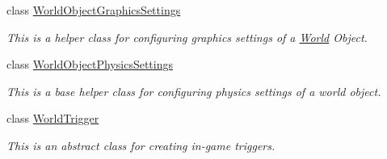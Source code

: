 \begin{DoxyCompactItemize}
class \hyperlink{classMezzanine_1_1WorldObjectGraphicsSettings}{WorldObjectGraphicsSettings}
\begin{DoxyCompactList}\small\item\em This is a helper class for configuring graphics settings of a \hyperlink{classMezzanine_1_1World}{World} Object. \item\end{DoxyCompactList}\item 
class \hyperlink{classMezzanine_1_1WorldObjectPhysicsSettings}{WorldObjectPhysicsSettings}
\begin{DoxyCompactList}\small\item\em This is a base helper class for configuring physics settings of a world object. \item\end{DoxyCompactList}\item 
class \hyperlink{classMezzanine_1_1WorldTrigger}{WorldTrigger}
\begin{DoxyCompactList}\small\item\em This is an abstract class for creating in-\/game triggers. \item\end{DoxyCompactList}\end{DoxyCompactItemize}

